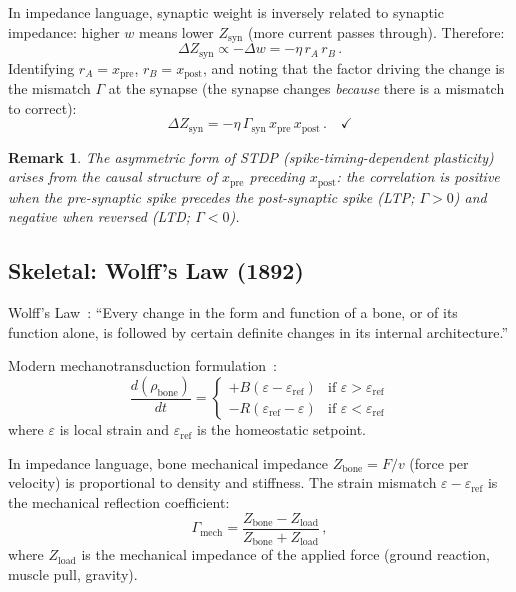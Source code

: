\documentclass[aps,pre,twocolumn,superscriptaddress,floatfix]{revtex4-2}
\newtheorem{remark}{Remark}
\begin{document}
In impedance language, synaptic weight is inversely related
to synaptic impedance: higher $w$ means lower $Z_{\text{syn}}$
(more current passes through).  Therefore:
\begin{equation}
  \Delta Z_{\text{syn}} \propto -\Delta w
  = -\eta\,r_A\,r_B\,.
\end{equation}
Identifying $r_A = x_{\text{pre}}$, $r_B = x_{\text{post}}$,
and noting that the factor driving the change is the
mismatch $\Gamma$ at the synapse (the synapse changes
\emph{because} there is a mismatch to correct):
\begin{equation}
  \Delta Z_{\text{syn}}
  = -\eta\,\Gamma_{\text{syn}}\,
    x_{\text{pre}}\,x_{\text{post}}\,.
  \quad \checkmark
  \label{eq:hebb-C2}
\end{equation}

\begin{remark}
The asymmetric form of STDP (spike-timing-dependent
plasticity) arises from the causal structure of
$x_{\text{pre}}$ preceding $x_{\text{post}}$:
the correlation is positive when the pre-synaptic spike
precedes the post-synaptic spike (LTP; $\Gamma > 0$)
and negative when reversed (LTD; $\Gamma < 0$).
\end{remark}


\subsection{Skeletal: Wolff's Law (1892)}
\label{sec:wolff}

Wolff's Law~\cite{Wolff1892}:
``Every change in the form and function of a bone, or of
its function alone, is followed by certain definite changes
in its internal architecture.''

Modern mechanotransduction formulation~\cite{Frost2003}:
\begin{equation}
  \frac{d(\rho_{\text{bone}})}{dt} =
  \begin{cases}
    +B(\varepsilon - \varepsilon_{\text{ref}})
      & \text{if } \varepsilon > \varepsilon_{\text{ref}} \\
    -R(\varepsilon_{\text{ref}} - \varepsilon)
      & \text{if } \varepsilon < \varepsilon_{\text{ref}}
  \end{cases}
  \label{eq:wolff-frost}
\end{equation}
where $\varepsilon$ is local strain and $\varepsilon_{\text{ref}}$
is the homeostatic setpoint.

In impedance language, bone mechanical impedance
$Z_{\text{bone}} = F/v$ (force per velocity) is proportional
to density and stiffness.  The strain mismatch
$\varepsilon - \varepsilon_{\text{ref}}$ is
the mechanical reflection coefficient:
\begin{equation}
  \Gamma_{\text{mech}} =
  \frac{Z_{\text{bone}} - Z_{\text{load}}}
       {Z_{\text{bone}} + Z_{\text{load}}}\,,
\end{equation}
where $Z_{\text{load}}$ is the mechanical impedance of
the applied force (ground reaction, muscle pull, gravity).
\end{document}
